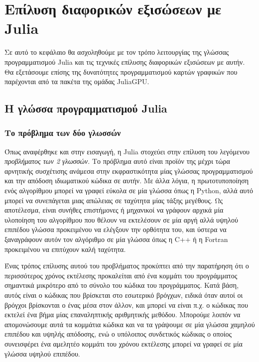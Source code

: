 \chapter{Επίλυση διαφορικών εξισώσεων με Julia}
\label{chapter:julia-diffeq}

Σε αυτό το κεφάλαιο θα ασχοληθούμε με τον τρόπο λειτουργίας της γλώσσας προγραμματισμού Julia και τις τεχνικές επίλυσης διαφορικών εξισώσεων με αυτήν.
Θα εξετάσουμε επίσης της δυνατότητες προγραμματισμού καρτών γραφικών που παρέχονται από τα πακέτα της ομάδας JuliaGPU.

\section{Η γλώσσα προγραμματισμού Julia}

\subsection{Το πρόβλημα των δύο γλωσσών}

Όπως αναφέρθηκε και στην εισαγωγή, η Julia στοχεύει στην επίλυση του λεγόμενου \emph{προβλήματος των 2 γλωσσών}.
Το πρόβλημα αυτό είναι προϊόν της μέχρι τώρα αρνητικής συσχέτισης ανάμεσα στην εκφραστικότητα μίας γλώσσας προγραμματισμού και την απόδοση ιδιωματικού κώδικα σε αυτήν.
Με άλλα λόγια, η πρωτοτυποποίηση ενός αλγορίθμου μπορεί να γραφεί εύκολα σε μία γλώσσα όπως η Python, αλλά αυτό μπορεί να συνεπάγεται μιας απώλειας σε ταχύτητα μίας τάξης μεγέθους.
Ως αποτέλεσμα, είναι συνήθες επιστήμονες ή μηχανικοί να γράφουν αρχικά μία υλοποίηση του αλγορίθμου που θέλουν να εκτελέσουν σε μία αργή αλλά υψηλού επιπέδου γλώσσα προκειμένου να ελέγξουν την ορθότητα του, και ύστερα να ξαναγράφουν αυτόν τον αλγόριθμο σε μία γλώσσα όπως η C++ ή η Fortran προκειμένου να επιτύχουν καλή ταχύτητα.

Ένας τρόπος επίλυσης αυτού του προβλήματος προκύπτει από την παρατήρηση ότι ο περισσότερος χρόνος εκτέλεσης προκαλείται από ένα κομμάτι του προγράμματος σημαντικά μικρότερο από το σύνολο του κώδικα του προγράμματος.
Κατά βάση, αυτός είναι ο κώδικας που βρίσκεται στο εσωτερικό βρόγχων, ειδικά όταν αυτοί οι βρόγχοι βρίσκονται ο ένας μέσα στον άλλον, και μπορεί να είναι π.χ. ο κώδικας που εκτελεί ένα βήμα μίας επαναληπτικής αριθμητικής μεθόδου.
Μπορούμε λοιπόν να απομονώσουμε αυτά τα κομμάτια κώδικα και να τα γράψουμε σε μία γλώσσα χαμηλού επιπέδου και υψηλής απόδοσης, ενώ ο υπόλοιπος συνδετικός κώδικας ο οποίος συνεισφέρει ένα αμελητέο κομμάτι του χρόνου εκτέλεσης μπορεί να γραφεί σε μία γλώσσα υψηλού επιπέδου.


